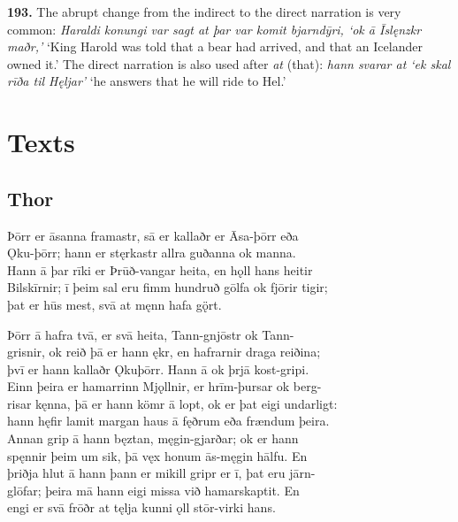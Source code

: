 \documentclass[12pt,letterpaper]{book}
\newcommand\emptypage{\clearpage{\pagestyle{empty}\cleardoublepage}}
\begin{document}
\textbf{193.} The abrupt change from the indirect to the direct narration
is very common: \textit{Haraldi konungi var sagt at þar var komit
bjarndȳri, `ok ā Īslęnzkr maðr,'} `King Harold was told that a
bear had arrived, and that an Icelander owned it.'  The direct
narration is also used after \textit{at} (that): \textit{hann svarar at `ek
skal rīða til Hęljar'} `he answers that he will ride to Hel.'

\emptypage

\part{Texts}


\emptypage

\chapter{Thor}

\resetlinenumber
\begin{linenumbers}

Þōrr er āsanna framastr, sā er kallaðr er Āsa-þōrr eða\\
Ǫku-þōrr; hann er stęrkastr allra guðanna ok manna.\\
Hann ā þar rīki er Þrūð-vangar heita, en hǫll hans heitir\\
Bilskīrnir; ī þeim sal eru fimm hundruð gōlfa ok fjōrir tigir;\\
þat er hūs mest, svā at męnn hafa gǫ̈rt.

Þōrr ā hafra tvā, er svā heita, Tann-gnjōstr ok Tann-\\
grisnir, ok reið þā er hann ękr, en hafrarnir draga reiðina;\\
þvī er hann kallaðr Ǫkuþōrr.  Hann ā ok þrjā kost-gripi.\\
Einn þeira er hamarrinn Mjǫllnir, er hrīm-þursar ok berg-\\
risar kęnna, þā er hann kömr ā lopt, ok er þat eigi undarligt:\\
hann hęfir lamit margan haus ā fęðrum eða frændum þeira.\\
Annan grip ā hann bęztan, męgin-gjarðar; ok er hann\\
spęnnir þeim um sik, þā vęx honum ās-męgin hālfu.  En\\
þriðja hlut ā hann þann er mikill gripr er ī, þat eru jārn-\\
glōfar; þeira mā hann eigi missa við hamarskaptit.  En\\
engi er svā frōðr at tęlja kunni ǫll stōr-virki hans.\\

\end{linenumbers}
\end{document}
